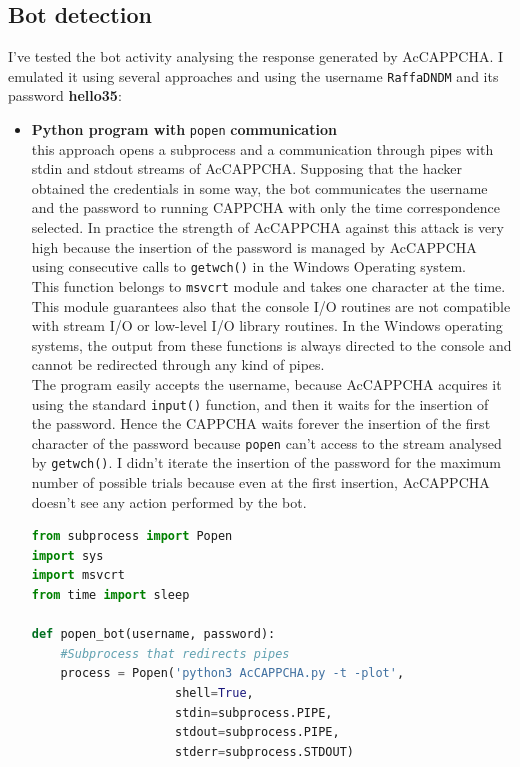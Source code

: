 \subsection{Bot detection}
I've tested the bot activity analysing the response generated by AcCAPPCHA. I emulated it using several approaches and using the username \texttt{RaffaDNDM} and its password \textbf{hello35}:
\begin{itemize}
\item{\textbf{Python program with} \texttt{popen} \textbf{communication}\\
this approach opens a subprocess and a communication through pipes with stdin and stdout streams of AcCAPPCHA. Supposing that the hacker obtained the credentials in some way, the bot communicates the username and the password to running CAPPCHA with only the time correspondence selected. In practice the strength of AcCAPPCHA against this attack is very high because the insertion of the password is managed by AcCAPPCHA using consecutive calls to \texttt{getwch()} in the Windows Operating system. \\
This function belongs to \texttt{msvcrt} module and takes one character at the time. This module guarantees also that the console I/O routines are not compatible with stream I/O or low-level I/O library routines. In the Windows operating systems, the output from these functions is always directed to the console and cannot be redirected through any kind of pipes.\\
The program easily accepts the username, because AcCAPPCHA acquires it using the standard \texttt{input()} function, and then it waits for the insertion of the password. Hence the CAPPCHA waits forever the insertion of the first character of the password because \texttt{popen} can't access to the stream analysed by \texttt{getwch()}. I didn't iterate the insertion of the password for the maximum number of possible trials because even at the first insertion, AcCAPPCHA doesn't see any action performed by the bot.
\begin{lstlisting}[language=python, showstringspaces=false, tabsize=4, basicstyle=\footnotesize, caption={\footnotesize{Bot using popen.}},label={Results:popen_bot}]
from subprocess import Popen
import sys
import msvcrt
from time import sleep

def popen_bot(username, password):
    #Subprocess that redirects pipes
    process = Popen('python3 AcCAPPCHA.py -t -plot',
    				shell=True, 
    				stdin=subprocess.PIPE,
    				stdout=subprocess.PIPE,
    				stderr=subprocess.STDOUT)


\end{lstlisting}}
\end{itemize}
